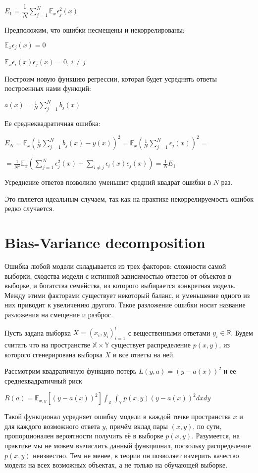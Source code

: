\documentclass{article}
\begin{document}
$E_1= \dfrac{1}{N}\sum_{j=1}^{N}\mathbb{E}_x\epsilon^2_j(x)$

Предположим, что ошибки несмещены и некоррелированы:

$\mathbb{E}_x\epsilon_j(x) = 0$

$ \mathbb{E}_x\epsilon_i(x)\epsilon_j(x) = 0$,  $i\neq j$

Построим  новую функцию регрессии, которая будет усреднять ответы построенных нами функций:

$a(x) = \frac{1}{N}\sum_{j=1}^{N}b_j(x)$

Ее среднеквадратичная ошибка:

$E_N = \mathbb{E}_x\left(\frac{1}{N}\sum_{j=1}^{N}b_j(x)-y(x)\right)^2 = \mathbb{E}_x\left(\frac{1}{N}\sum_{j=1}^{N}\epsilon_j(x)\right)^2 = $

$=\frac{1}{N^2}\mathbb{E}_x\left(\sum_{j=1}^{N}\epsilon^2_j(x) + \sum_{i\neq j}^{}\epsilon_i(x)\epsilon_j(x)\right)=\frac{1}{N}E_1$

Усреднение ответов позволило уменьшит средний квадрат ошибки в $N$ раз.

Это является идеальным случаем, так как на практике некоррелируемость ошибок редко случается.

\section{Bias-Variance decomposition}

Ошибка любой модели складывается из трех факторов: сложности самой выборки, сходства модели с истинной зависимостью ответов от объектов в выборке, и богатства семейства, из которого выбирается конкретная модель. Между этими факторами существует некоторый баланс, и уменьшение одного из них приводит к увеличению другого. Такое разложение ошибки носит название разложения на смещение и разброс.

Пусть задана выборка $X = (x_i,y_i)^l_{i=1}$ с вещественными ответами $y_i \in \mathbb{R}$. Будем считать что на пространстве $\mathbb{X} \times \mathbb{Y}$ существует распределение $p(x,y)$, из которого сгенерирована выборка $X$ и все ответы на ней.

Рассмотрим квадратичную функцию потерь $L(y,a) = (y-a(x))^2$ и ее среднеквадратичный риск

$R(a) = \mathbb{E}_{x,y}\left[(y-a(x))^2\right] \int_{\mathbb{X}}\int_{\mathbb{Y}} p(x,y)(y-a(x))^2dxdy$

Такой функционал усредняет ошибку модели в каждой точке пространства $x$ и для каждого возможного ответа $y$, причём вклад пары $(x, y)$, по сути, пропорционален вероятности получить её в выборке $p(x, y)$. Разумеется, на практике мы не можем вычислить данный функционал, поскольку распределение $p(x, y)$ неизвестно. Тем не менее, в теории он позволяет измерить качество модели на всех возможных объектах, а не только на обучающей выборке.
\end{document}
